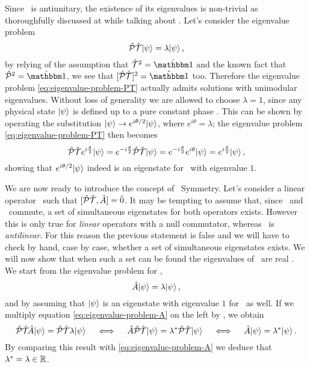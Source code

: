         Since \hPT\ is antiunitary, the existence of its eigenvalues is non-trivial as thoroughfully discussed at  while talking about \hT. Let's consider the eigenvalue problem
        \begin{equation}
            \label{eq:eigenvalue-problem-PT}
            \mathcal{\hat{P}}\mathcal{\hat{T}}\! \ket{\psi} = \lambda\! \ket{\psi}
            \text{,}
        \end{equation}
        by relying of the assumption that $\hT^2 = \hidM$ and the known fact that $\hP^2 = \hidM$, we see that $\bqty*{\hPT}\!^2 = \togglehat{\idM}$ too. Therefore the eigenvalue problem \eqref{eq:eigenvalue-problem-PT} actually admits solutions with unimodular eigenvalues. Without loss of generality we are allowed to choose $\lambda = 1$, since any physical state $\ket{\psi}$ is defined up to a pure constant phase \cite{Bender2005}. This can be shown by operating the substitution $\ket{\psi} \rightarrow e^{i\theta / 2}\!\ket{\psi}$, where $e^{i\theta} = \lambda$; the eigenvalue problem \eqref{eq:eigenvalue-problem-PT} then becomes
        \begin{equation*}
            \mathcal{\hat{P}}\mathcal{\hat{T}} e^{i\frac{\theta}{2}}\! \ket{\psi}
            = e^{-i\frac{\theta}{2}} \mathcal{\hat{P}}\mathcal{\hat{T}}\! \ket{\psi}
            = e^{-i\frac{\theta}{2}} e^{i\theta}\! \ket{\psi}
            = e^{i\frac{\theta}{2}}\! \ket{\psi}
            \text{,}
        \end{equation*}
        showing that $e^{i\theta / 2}\! \ket{\psi}$ indeed is an eigenstate for \hPT\ with eigenvalue $1$.

        We are now ready to introduce the concept of \PT\ Symmetry. Let's consider a linear operator \hA\ such that $\comm*{\hPT}{\hA}\! = \hzero$. It may be tempting to assume that, since \hA\ and \hPT\ commute, a set of simultaneous eigenstates for both operators exists. However this is only true for \emph{linear} operators with a null commutator, whereas \hPT\ is \emph{antilinear}. For this reason the previous statement is false \cite{bender2024} and we will have to check by hand, case by case, whether a set of simultaneous eigenstates exists. We will now show that when such a set can be found the eigenvalues of \hA\ are real \cite{bender2024}. We start from the eigenvalue problem for \hA,
        \begin{equation}
            \label{eq:eigenvalue-problem-A}
            \hat{A}\! \ket{\psi} = \lambda\! \ket{\psi}
            \text{,}
        \end{equation}
        and by assuming that $\ket{\psi}$ is an eigenstate with eigenvalue $1$ for \hPT\ as well. If we multiply equation \eqref{eq:eigenvalue-problem-A} on the left by \hPT, we obtain
        \begin{equation*}
            \mathcal{\hat{P}}\mathcal{\hat{T}}\! \hat{A}\! \ket{\psi} = \mathcal{\hat{P}}\mathcal{\hat{T}} \lambda\! \ket{\psi}
            \quad\iff\quad
            \hat{A} \mathcal{\hat{P}}\mathcal{\hat{T}}\! \ket{\psi} = \lambda^* \mathcal{\hat{P}}\mathcal{\hat{T}}\! \ket{\psi}
            \quad\iff\quad
            \hat{A}\! \ket{\psi} = \lambda^*\! \ket{\psi}
            \text{.}
        \end{equation*}
        By comparing this result with \eqref{eq:eigenvalue-problem-A} we deduce that $\lambda^* = \lambda \in \mathbb{R}$.

